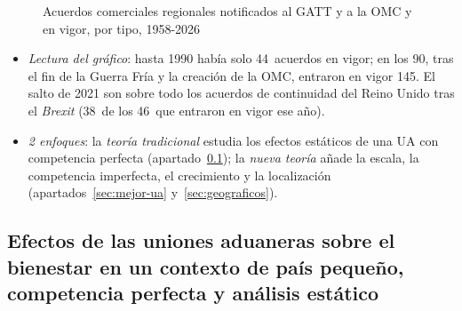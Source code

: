 \documentclass[11pt]{article}
\begin{document}
\begin{figure}[H]
\centering
\caption{Acuerdos comerciales regionales notificados al GATT y a la OMC y en vigor, por tipo, 1958-2026}\label{fig:acr-en-vigor}
\end{figure}

\begin{itemize}
\item \emph{Lectura del gráfico}: hasta 1990 había solo 44~acuerdos en vigor; en los 90, tras el fin de la Guerra Fría y la creación de la OMC, entraron en vigor 145. El salto de 2021 son sobre todo los acuerdos de continuidad del Reino Unido tras el \emph{Brexit} (38~de los 46~que entraron en vigor ese año)\nocite{OMC2026RTAISExportacion}.
\item \emph{2 enfoques}: la \emph{teoría tradicional} estudia los efectos estáticos de una UA con competencia perfecta (apartado~\ref{sec:estaticos}); la \emph{nueva teoría} añade la escala, la competencia imperfecta, el crecimiento y la localización (apartados~\ref{sec:mejor-ua} y~\ref{sec:geograficos}).
\end{itemize}

\subsection{Efectos de las uniones aduaneras sobre el bienestar\cortetitulo{} en un contexto de país pequeño, competencia perfecta y análisis estático}\label{sec:estaticos}
\end{document}
